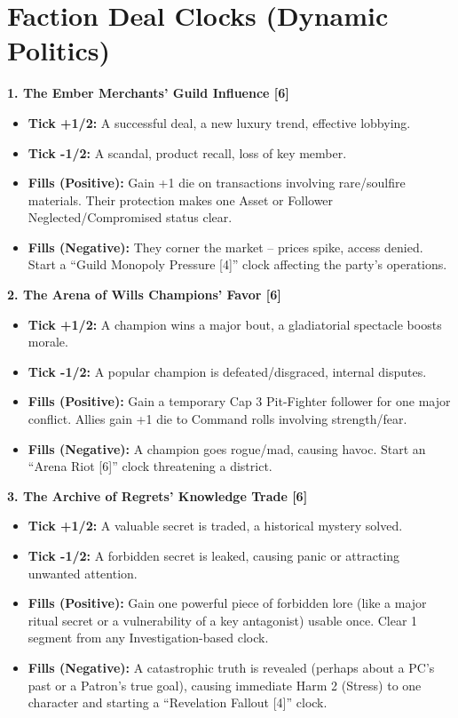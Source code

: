 \documentclass[11pt,letterpaper]{article}
\newcommand{\patronbox}[1]{\noindent\textbf{#1}\\}
\begin{document}
\newpage

\section{Faction Deal Clocks (Dynamic Politics)}

\patronbox{1. The Ember Merchants' Guild Influence [6]}
\begin{itemize}[leftmargin=*]
    \item \textbf{Tick +1/2:} A successful deal, a new luxury trend, effective lobbying.
    \item \textbf{Tick -1/2:} A scandal, product recall, loss of key member.
    \item \textbf{Fills (Positive):} Gain +1 die on transactions involving rare/soulfire materials. Their protection makes one Asset or Follower Neglected/Compromised status clear.
    \item \textbf{Fills (Negative):} They corner the market -- prices spike, access denied. Start a ``Guild Monopoly Pressure [4]'' clock affecting the party's operations.
\end{itemize}

\patronbox{2. The Arena of Wills Champions' Favor [6]}
\begin{itemize}[leftmargin=*]
    \item \textbf{Tick +1/2:} A champion wins a major bout, a gladiatorial spectacle boosts morale.
    \item \textbf{Tick -1/2:} A popular champion is defeated/disgraced, internal disputes.
    \item \textbf{Fills (Positive):} Gain a temporary Cap 3 Pit-Fighter follower for one major conflict. Allies gain +1 die to Command rolls involving strength/fear.
    \item \textbf{Fills (Negative):} A champion goes rogue/mad, causing havoc. Start an ``Arena Riot [6]'' clock threatening a district.
\end{itemize}

\patronbox{3. The Archive of Regrets' Knowledge Trade [6]}
\begin{itemize}[leftmargin=*]
    \item \textbf{Tick +1/2:} A valuable secret is traded, a historical mystery solved.
    \item \textbf{Tick -1/2:} A forbidden secret is leaked, causing panic or attracting unwanted attention.
    \item \textbf{Fills (Positive):} Gain one powerful piece of forbidden lore (like a major ritual secret or a vulnerability of a key antagonist) usable once. Clear 1 segment from any Investigation-based clock.
    \item \textbf{Fills (Negative):} A catastrophic truth is revealed (perhaps about a PC's past or a Patron's true goal), causing immediate Harm 2 (Stress) to one character and starting a ``Revelation Fallout [4]'' clock.
\end{itemize}
\end{document}
